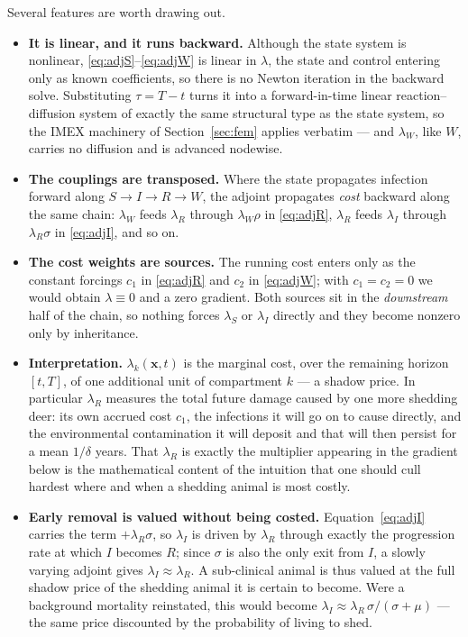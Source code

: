 \documentclass[11pt]{article}
\begin{document}
Several features are worth drawing out.
\begin{itemize}
\item \textbf{It is linear, and it runs backward.} Although the state system is nonlinear, \eqref{eq:adjS}--\eqref{eq:adjW} is linear in $\lambda$, the state and control entering only as known coefficients, so there is no Newton iteration in the backward solve. Substituting $\tau = T-t$ turns it into a forward-in-time linear reaction--diffusion system of exactly the same structural type as the state system, so the IMEX machinery of Section~\ref{sec:fem} applies verbatim --- and $\lambda_W$, like $W$, carries no diffusion and is advanced nodewise.

\item \textbf{The couplings are transposed.} Where the state propagates infection forward along $S\to I\to R\to W$, the adjoint propagates \emph{cost} backward along the same chain: $\lambda_W$ feeds $\lambda_R$ through $\lambda_W\rho$ in \eqref{eq:adjR}, $\lambda_R$ feeds $\lambda_I$ through $\lambda_R\sigma$ in \eqref{eq:adjI}, and so on.

\item \textbf{The cost weights are sources.} The running cost enters only as the constant forcings $c_1$ in \eqref{eq:adjR} and $c_2$ in \eqref{eq:adjW}; with $c_1=c_2=0$ we would obtain $\lambda\equiv 0$ and a zero gradient. Both sources sit in the \emph{downstream} half of the chain, so nothing forces $\lambda_S$ or $\lambda_I$ directly and they become nonzero only by inheritance.

\item \textbf{Interpretation.} $\lambda_k(\mathbf{x},t)$ is the marginal cost, over the remaining horizon $[t,T]$, of one additional unit of compartment $k$ --- a shadow price. In particular $\lambda_R$ measures the total future damage caused by one more shedding deer: its own accrued cost $c_1$, the infections it will go on to cause directly, and the environmental contamination it will deposit and that will then persist for a mean $1/\delta$ years. That $\lambda_R$ is exactly the multiplier appearing in the gradient below is the mathematical content of the intuition that one should cull hardest where and when a shedding animal is most costly.

\item \textbf{Early removal is valued without being costed.} Equation~\eqref{eq:adjI} carries the term $+\lambda_R\sigma$, so $\lambda_I$ is driven by $\lambda_R$ through exactly the progression rate at which $I$ becomes $R$; since $\sigma$ is also the only exit from $I$, a slowly varying adjoint gives $\lambda_I \approx \lambda_R$. A sub-clinical animal is thus valued at the full shadow price of the shedding animal it is certain to become. Were a background mortality reinstated, this would become $\lambda_I \approx \lambda_R\,\sigma/(\sigma+\mu)$ --- the same price discounted by the probability of living to shed.


\end{itemize}
\end{document}
